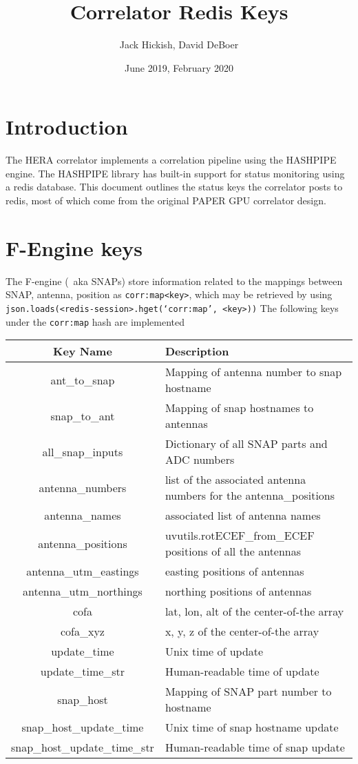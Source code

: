 \documentclass{article}
\title{Correlator Redis Keys}
\author{Jack Hickish, David DeBoer}
\date{June 2019, February 2020}
\begin{document}
\maketitle

\section{Introduction}
The HERA correlator implements a correlation pipeline using the HASHPIPE engine. The HASHPIPE library has built-in support for status monitoring using a redis database.
This document outlines the status keys the correlator posts to redis, most of which come from the original PAPER GPU correlator design.

\section{F-Engine keys}

The F-engine (~aka SNAPs) store information related to the mappings between SNAP, antenna, position as \texttt{corr:map<key>}, which may be retrieved by using \texttt{json.loads(<redis-session>.hget(`corr:map', <key>))}
The following keys under the \texttt{corr:map} hash are implemented

\begin{centering}
\begin{tabular}{c p{}}
\hline
Key Name & Description \\
\hline
\hline
ant\_to\_snap           & Mapping of antenna number to snap hostname \\
snap\_to\_ant           & Mapping of snap hostnames to antennas \\
all\_snap\_inputs     & Dictionary of all SNAP parts and ADC numbers \\
antenna\_numbers  & list of the associated antenna numbers for the antenna\_positions \\
antenna\_names & associated list of antenna names \\
antenna\_positions                   & uvutils.rotECEF\_from\_ECEF positions of all the antennas \\
antenna\_utm\_eastings & easting positions of antennas \\
antenna\_utm\_northings & northing positions of antennas \\
cofa                          & lat, lon, alt of the center-of-the array \\
cofa\_xyz                 & x, y, z of the center-of-the array \\
update\_time           & Unix time of update \\
update\_time\_str     & Human-readable time of update \\
snap\_host                & Mapping of SNAP part number to hostname \\
snap\_host\_update\_time & Unix time of snap hostname update \\
snap\_host\_update\_time\_str & Human-readable time of snap update\\
\end{tabular}
\end{centering}
\end{document}
